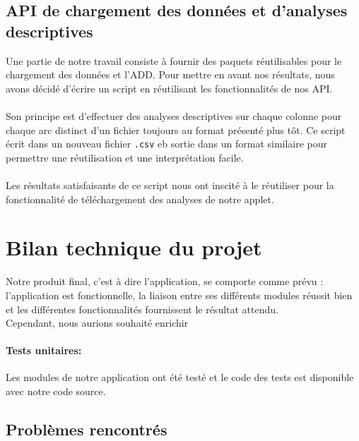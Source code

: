 	\subsection{API de chargement des données et d'analyses descriptives}
		Une partie de notre travail consiste à fournir des paquets réutilisables pour le chargement des données et l'ADD. Pour mettre en avant nos résultats, nous avons décidé d'écrire un script en réutilisant les fonctionnalités de nos API.
		\paragraph{}Son principe est d'effectuer des analyses descriptives sur chaque colonne pour chaque arc distinct d'un fichier toujours au format présenté plus tôt. Ce script écrit dans un nouveau fichier \lstinline!.csv! eb sortie dans un format similaire pour permettre une réutilisation et une interprétation facile.
		\paragraph{}Les résultats satisfaisants de ce script nous ont inscité à le réutiliser pour la fonctionnalité de téléchargement des analyses de notre applet.
		
	\section{Bilan technique du projet}
		Notre produit final, c'est à dire l'application, se comporte comme prévu : l'application est fonctionnelle, la liaison entre ses différents modules réussit bien et les différentes fonctionnalités fournissent le résultat attendu.\\
		Cependant, nous aurions souhaité enrichir
		\paragraph{Tests unitaires:}Les modules de notre application ont été testé et le code des tests est disponible avec notre code source.
		
		\subsection{Problèmes rencontrés}
